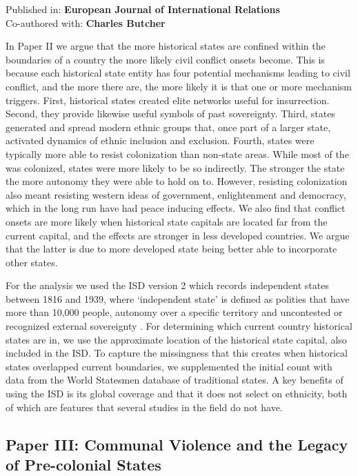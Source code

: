 Published in: \textbf{European Journal of International Relations}\\
Co-authored with: \textbf{Charles Butcher}

In Paper II we argue that the more historical states are confined within the
boundaries of a country the more likely civil conflict onsets become. This is
because each historical state entity has four potential mechanisms leading to
civil conflict, and the more there are, the more likely it is that one or more
mechanism triggers. First, historical states created elite networks useful for
insurrection. Second, they provide likewise useful symbols of past sovereignty.
Third, states generated and spread modern ethnic groups that, once part of a
larger state, activated dynamics of ethnic inclusion and exclusion. Fourth,
states were typically more able to resist colonization than non-state areas.
While most of the was colonized, states were more likely to be so indirectly.
The stronger the state the more autonomy they were able to hold on to. However,
resisting colonization also meant resisting western ideas of government,
enlightenment and democracy, which in the long run have had peace inducing
effects. We also find that conflict onsets are more likely when historical state
capitals are located far from the current capital, and the effects are stronger
in less developed countries. We argue that the latter is due to more developed
state being better able to incorporate other states.

For the analysis we used the ISD version 2 which records independent states
between 1816 and 1939, where `independent state' is defined as polities that
have more than 10,000 people, autonomy over a specific territory and uncontested
or recognized external sovereignty \citep{Butcher2020}. For determining which
current country historical states are in, we use the approximate location of the
historical state capital, also included in the ISD. To capture the missingness
that this creates when historical states overlapped current boundaries, we
supplemented the initial count with data from the World Statesmen database of
traditional states. A key benefits of using the ISD is its global coverage and
that it does not select on ethnicity, both of which are features that several
studies in the field do not have. 

\subsection{Paper III: Communal Violence and the Legacy of Pre-colonial States}
\label{Paper 3}

